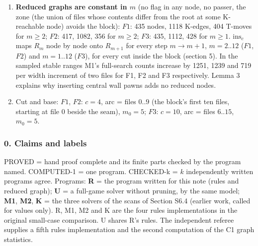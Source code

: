 \begin{enumerate}
\item \textbf{Reduced graphs are constant in $m$} (no flag in any node, no passer, the zone (the union of files whose contents differ from the root at some K-reachable node) avoids the block): $F1$: 435 nodes, 1118 K-edges, 404 T-moves for $m\ge2$; $F2$: 417, 1082, 356 for $m\ge2$; $F3$: 435, 1112, 428 for $m\ge1$. $\mathrm{ins}_c$ maps $R_m$ node by node onto $R_{m+1}$ for every step $m\to m+1$, $m=2..12$ ($F1$, $F2$) and $m=1..12$ ($F3$), for every cut inside the block (section 5). In the sampled stable ranges M1's full-search counts increase by 1251, 1239 and 719 per width increment of two files for F1, F2 and F3 respectively. Lemma 3 explains why inserting central wall pawns adds no reduced nodes.
\item Cut and base: $F1$, $F2$: $c=4$, arc = files $0..9$ (the block's first ten files, starting at file 0 beside the seam), $m_0=5$; $F3$: $c=10$, arc = files $6..15$, $m_0=5$.
\end{enumerate}
\subsubsection*{0. Claims and labels}
PROVED = hand proof complete and its finite parts checked by the program named. COMPUTED-1 = one program. CHECKED-k = $k$ independently written programs agree. Programs: \textbf{R} = the program written for this note (rules and reduced graph); \textbf{U} = a full-game solver without pruning, by the same model; \textbf{M1}, \textbf{M2}, \textbf{K} = the three solvers of the scans of Section S6.4 (earlier work, called for values only). R, M1, M2 and K are the four rules implementations in the original small-case comparison. U shares R's rules. The independent referee supplies a fifth rules implementation and the second computation of the C1 graph statistics.

